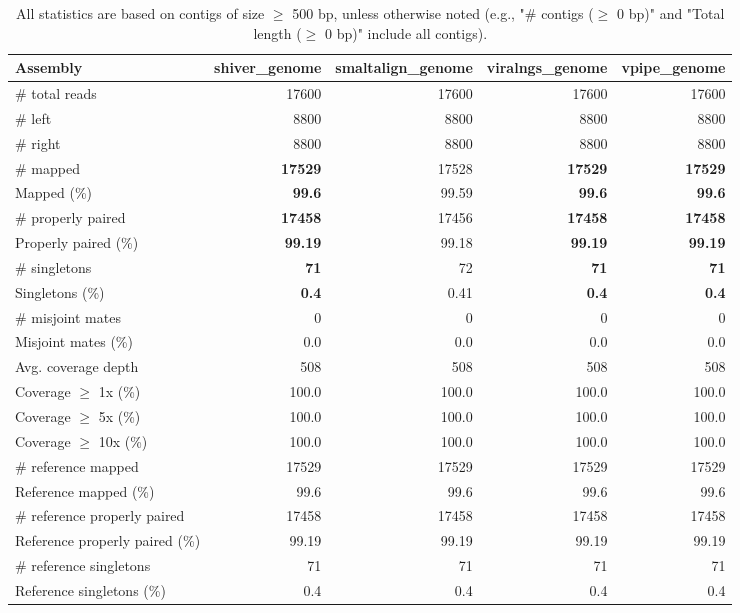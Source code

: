 \documentclass[12pt,a4paper]{article}
\begin{document}
\begin{table}[ht]
\begin{center}
\caption{All statistics are based on contigs of size $\geq$ 500 bp, unless otherwise noted (e.g., "\# contigs ($\geq$ 0 bp)" and "Total length ($\geq$ 0 bp)" include all contigs).}
\begin{tabular}{|l*{4}{|r}|}
\hline
Assembly & shiver\_genome & smaltalign\_genome & viralngs\_genome & vpipe\_genome \\ \hline
\# total reads & 17600 & 17600 & 17600 & 17600 \\ \hline
\# left & 8800 & 8800 & 8800 & 8800 \\ \hline
\# right & 8800 & 8800 & 8800 & 8800 \\ \hline
\# mapped & {\bf 17529} & 17528 & {\bf 17529} & {\bf 17529} \\ \hline
Mapped (\%) & {\bf 99.6} & 99.59 & {\bf 99.6} & {\bf 99.6} \\ \hline
\# properly paired & {\bf 17458} & 17456 & {\bf 17458} & {\bf 17458} \\ \hline
Properly paired (\%) & {\bf 99.19} & 99.18 & {\bf 99.19} & {\bf 99.19} \\ \hline
\# singletons & {\bf 71} & 72 & {\bf 71} & {\bf 71} \\ \hline
Singletons (\%) & {\bf 0.4} & 0.41 & {\bf 0.4} & {\bf 0.4} \\ \hline
\# misjoint mates & 0 & 0 & 0 & 0 \\ \hline
Misjoint mates (\%) & 0.0 & 0.0 & 0.0 & 0.0 \\ \hline
Avg. coverage depth & 508 & 508 & 508 & 508 \\ \hline
Coverage $\geq$ 1x (\%) & 100.0 & 100.0 & 100.0 & 100.0 \\ \hline
Coverage $\geq$ 5x (\%) & 100.0 & 100.0 & 100.0 & 100.0 \\ \hline
Coverage $\geq$ 10x (\%) & 100.0 & 100.0 & 100.0 & 100.0 \\ \hline
\# reference mapped & 17529 & 17529 & 17529 & 17529 \\ \hline
Reference mapped (\%) & 99.6 & 99.6 & 99.6 & 99.6 \\ \hline
\# reference properly paired & 17458 & 17458 & 17458 & 17458 \\ \hline
Reference properly paired (\%) & 99.19 & 99.19 & 99.19 & 99.19 \\ \hline
\# reference singletons & 71 & 71 & 71 & 71 \\ \hline
Reference singletons (\%) & 0.4 & 0.4 & 0.4 & 0.4 \\ \hline

\end{tabular}
\end{center}
\end{table}
\end{document}
